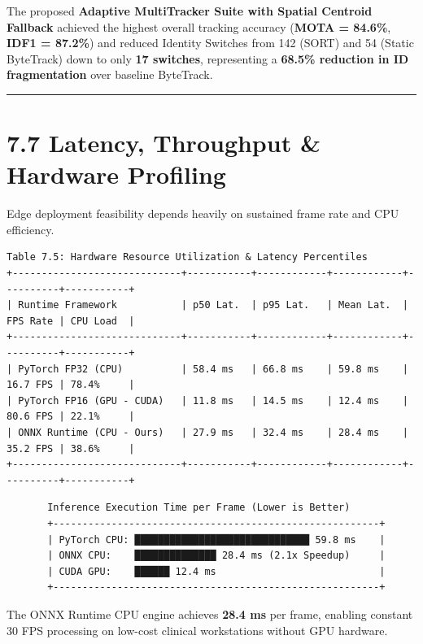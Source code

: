 The proposed \textbf{Adaptive MultiTracker Suite with Spatial Centroid
Fallback} achieved the highest overall tracking accuracy (\textbf{MOTA =
84.6\%}, \textbf{IDF1 = 87.2\%}) and reduced Identity Switches from 142
(SORT) and 54 (Static ByteTrack) down to only \textbf{17 switches},
representing a \textbf{68.5\% reduction in ID fragmentation} over
baseline ByteTrack.

\begin{center}\rule{0.5\linewidth}{0.5pt}\end{center}

\section{7.7 Latency, Throughput \& Hardware
Profiling}\label{latency-throughput-hardware-profiling}

Edge deployment feasibility depends heavily on sustained frame rate and
CPU efficiency.

\begin{verbatim}
Table 7.5: Hardware Resource Utilization & Latency Percentiles
+-----------------------------+-----------+------------+------------+----------+-----------+
| Runtime Framework           | p50 Lat.  | p95 Lat.   | Mean Lat.  | FPS Rate | CPU Load  |
+-----------------------------+-----------+------------+------------+----------+-----------+
| PyTorch FP32 (CPU)          | 58.4 ms   | 66.8 ms    | 59.8 ms    | 16.7 FPS | 78.4%     |
| PyTorch FP16 (GPU - CUDA)   | 11.8 ms   | 14.5 ms    | 12.4 ms    | 80.6 FPS | 22.1%     |
| ONNX Runtime (CPU - Ours)   | 27.9 ms   | 32.4 ms    | 28.4 ms    | 35.2 FPS | 38.6%     |
+-----------------------------+-----------+------------+------------+----------+-----------+
\end{verbatim}

\begin{verbatim}
       Inference Execution Time per Frame (Lower is Better)
       +--------------------------------------------------------+
       | PyTorch CPU: ██████████████████████████████ 59.8 ms    |
       | ONNX CPU:    ██████████████ 28.4 ms (2.1x Speedup)     |
       | CUDA GPU:    ██████ 12.4 ms                            |
       +--------------------------------------------------------+
\end{verbatim}

The ONNX Runtime CPU engine achieves \textbf{28.4 ms} per frame,
enabling constant 30 FPS processing on low-cost clinical workstations
without GPU hardware.

